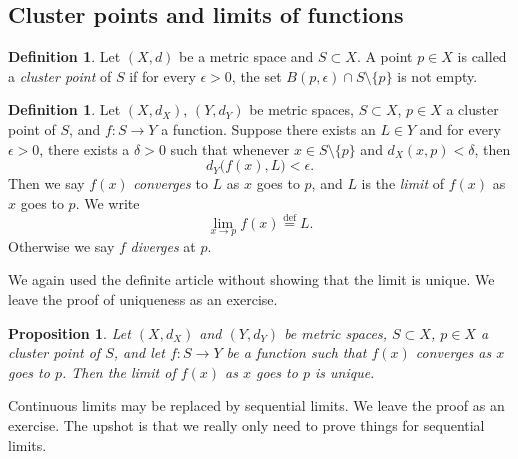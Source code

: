 \documentclass[12pt,openany]{book}
\theoremstyle{plain}
\newtheorem{prop}[thm]{Proposition}
\theoremstyle{remark}
\theoremstyle{definition}
\newtheorem{defn}[thm]{Definition}
\theoremstyle{exercise}
\theoremstyle{example}
\begin{document}
\subsection{Cluster points and limits of functions}

\begin{defn}
Let $(X,d)$ be a metric space and
$S \subset X$. A point $p \in X$ is called
a \emph{cluster point} of $S$
if for every $\epsilon > 0$, the set $B(p,\epsilon) \cap S
\setminus \{ p \}$ is not empty.
\end{defn}


\begin{defn}
%
Let $(X,d_X)$, $(Y,d_Y)$ be metric spaces, $S \subset X$, $p \in X$ a cluster point of $S$,
and $f \colon S \to Y$ a function.
Suppose there exists an $L \in Y$ and for every $\epsilon > 0$,
there exists a $\delta > 0$ such that whenever $x \in S \setminus \{ p \}$
and $d_X(x,p) < \delta$, then
\begin{equation*}
d_Y\bigl(f(x),L\bigr) < \epsilon .
\end{equation*}
Then we say $f(x)$
\emph{converges} to $L$ as $x$ goes
to $p$, and $L$ is the \emph{limit} of $f(x)$ as $x$
goes to $p$.  We write
\begin{equation*}
\lim_{x \to p} f(x) \overset{\text{def}}{=} L .
\end{equation*}
Otherwise we say $f$
\emph{diverges} at $p$.
\end{defn}

We again used the definite article without showing that the
limit is unique.  We leave the proof of uniqueness as an exercise.

\begin{prop} \label{prop:mslimitisunique}
Let $(X,d_X)$ and $(Y,d_Y)$ be metric spaces, $S \subset X$, $p \in X$
a cluster point of $S$, and let $f \colon S \to Y$ be a function
such that $f(x)$ converges as $x$ goes to $p$.  Then
the limit of $f(x)$ as $x$ goes to $p$ is unique.
\end{prop}

Continuous limits may be
replaced by sequential limits.  We leave the proof as an
exercise.  The upshot is that we really only need to prove things for
sequential limits.
\end{document}
